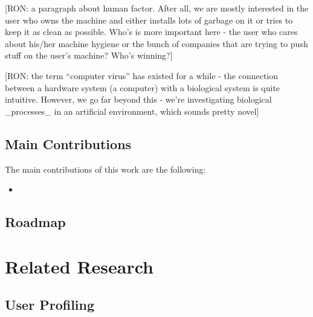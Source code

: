 \documentclass[11pt,oneside]{book}
\let\Oldsection\section
\renewcommand{\section}{\FloatBarrier\Oldsection}
\begin{document}
[RON: a paragraph about human factor. After all, we are mostly interested in the user who owns the machine and either installs lots of garbage on it or tries to keep it as clean as possible. Who's is more important here - the user who cares about his/her machine hygiene or the bunch of companies that are trying to push stuff on the user's machine? Who's winning?]

[RON: the term ``computer virus'' has existed for a while - the connection between a hardware system (a computer) with a biological system is quite intuitive. However, we go far beyond this - we're investigating biological \_processes\_ in an artificial environment, which sounds pretty novel]

\section{Main Contributions}
\label{sub:contributions}
The main contributions of this work are the following:
\begin{itemize}
\renewcommand{\labelitemi}{$\bullet$} 
\item 
\end{itemize}

\section{Roadmap}
\label{sub:roadmap}


\chapter{Related Research}
\label{sec:related}


\section{User Profiling}
\end{document}

